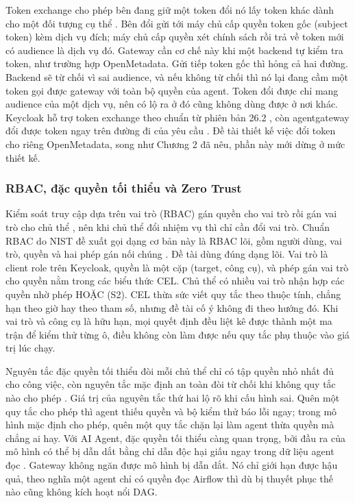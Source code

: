 Token exchange cho phép bên đang giữ một token đổi nó lấy token khác dành cho một đối tượng cụ thể \parencite{rfc8693}. Bên đổi gửi tới máy chủ cấp quyền token gốc (subject token) kèm dịch vụ đích; máy chủ cấp quyền xét chính sách rồi trả về token mới có audience là dịch vụ đó. Gateway cần cơ chế này khi một backend tự kiểm tra token, như trường hợp OpenMetadata. Gửi tiếp token gốc thì hỏng cả hai đường. Backend sẽ từ chối vì sai audience, và nếu không từ chối thì nó lại đang cầm một token gọi được gateway với toàn bộ quyền của agent. Token đổi được chỉ mang audience của một dịch vụ, nên có lộ ra ở đó cũng không dùng được ở nơi khác. Keycloak hỗ trợ token exchange theo chuẩn từ phiên bản 26.2 \parencite{keycloak_tokenexchange,graziano2025ste}, còn agentgateway đổi được token ngay trên đường đi của yêu cầu \parencite{agw_tokenexchange}. Đề tài thiết kế việc đổi token cho riêng OpenMetadata, song như Chương 2 đã nêu, phần này mới dừng ở mức thiết kế.

\subsubsection{RBAC, đặc quyền tối thiểu và Zero Trust}

Kiểm soát truy cập dựa trên vai trò (RBAC) gán quyền cho vai trò rồi gán vai trò cho chủ thể \parencite{sandhu1996rbac}, nên khi chủ thể đổi nhiệm vụ thì chỉ cần đổi vai trò. Chuẩn RBAC do NIST đề xuất gọi dạng cơ bản này là RBAC lõi, gồm người dùng, vai trò, quyền và hai phép gán nối chúng \parencite{ferraiolo2001nist}. Đề tài dùng đúng dạng lõi. Vai trò là client role trên Keycloak, quyền là một cặp (target, công cụ), và phép gán vai trò cho quyền nằm trong các biểu thức CEL. Chủ thể có nhiều vai trò nhận hợp các quyền nhờ phép HOẶC (S2). CEL thừa sức viết quy tắc theo thuộc tính, chẳng hạn theo giờ hay theo tham số, nhưng đề tài cố ý không đi theo hướng đó. Khi vai trò và công cụ là hữu hạn, mọi quyết định đều liệt kê được thành một ma trận để kiểm thử từng ô, điều không còn làm được nếu quy tắc phụ thuộc vào giá trị lúc chạy.

Nguyên tắc đặc quyền tối thiểu đòi mỗi chủ thể chỉ có tập quyền nhỏ nhất đủ cho công việc, còn nguyên tắc mặc định an toàn đòi từ chối khi không quy tắc nào cho phép \parencite{saltzer1975protection}. Giá trị của nguyên tắc thứ hai lộ rõ khi cấu hình sai. Quên một quy tắc cho phép thì agent thiếu quyền và bộ kiểm thử báo lỗi ngay; trong mô hình mặc định cho phép, quên một quy tắc chặn lại làm agent thừa quyền mà chẳng ai hay. Với AI Agent, đặc quyền tối thiểu càng quan trọng, bởi đầu ra của mô hình có thể bị dẫn dắt bằng chỉ dẫn độc hại giấu ngay trong dữ liệu agent đọc \parencite{breakingmcp}. Gateway không ngăn được mô hình bị dẫn dắt. Nó chỉ giới hạn được hậu quả, theo nghĩa một agent chỉ có quyền đọc Airflow thì dù bị thuyết phục thế nào cũng không kích hoạt nổi DAG.

